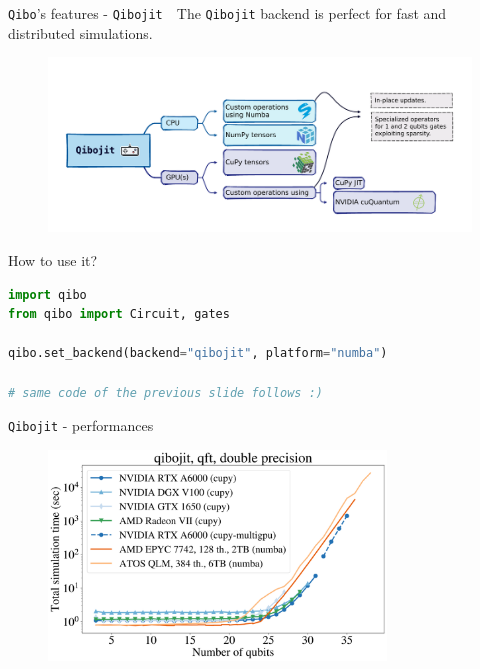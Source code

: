 \documentclass[8pt, xcolor={svgnames}, hyperref={linkcolor=black}]{beamer}
\begin{document}
\begin{frame}[fragile]{\texttt{Qibo}'s features - \texttt{Qibojit}}
\faFlash\,\, The \texttt{Qibojit} backend is perfect for fast and distributed simulations.
\pause
\begin{figure}  
   \includegraphics[width=1\textwidth]{figures/qibojit.pdf}
\end{figure}
\vspace{-1cm}
\pause
How to use it?
\pause
\begin{tcolorbox}
\large
\begin{lstlisting}[language=Python]
import qibo
from qibo import Circuit, gates

qibo.set_backend(backend="qibojit", platform="numba")

# same code of the previous slide follows :)
\end{lstlisting}
\end{tcolorbox}
\end{frame}

\begin{frame}{\texttt{Qibojit} - performances}
\begin{figure}  
   \includegraphics[width=0.8\textwidth]{figures/qibojit-qft.png}
\end{figure}
\end{frame}
\end{document}
